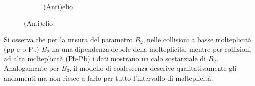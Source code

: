 \begin{figure}[h]
\begin{subfigure}{.49\textwidth}
        \caption{(Anti)elio}
        \label{fig:cB3vsMult}
    \end{subfigure}
    \label{fig:BAvsMult}
\end{figure}
Si osserva che per la misura del parametro $B_2$, nelle collisioni a basse molteplicità (pp e p-Pb) $B_2$ ha una dipendenza debole della molteplicità, mentre per collisioni ad alta molteplicità (Pb-Pb) i dati mostrano un calo sostanziale di $B_2$. 
Analogamente per $B_3$, il modello di coalescenza descrive qualitativamente gli andamenti ma non riesce a farlo per tutto l'intervallo di molteplicità.